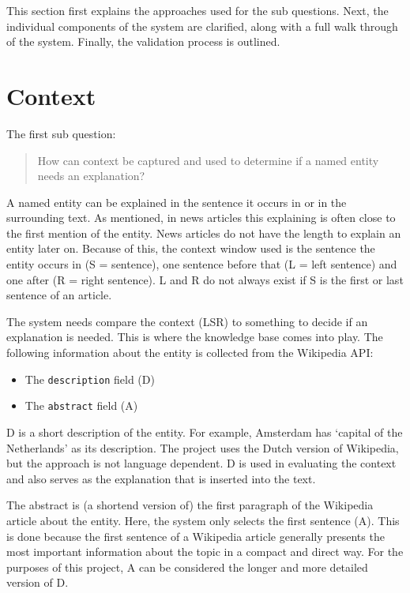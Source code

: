 \documentclass[
10pt, %
a4paper, %
oneside, %
headinclude,footinclude, %
] {book}%
\begin{document}
This section first explains the approaches used for the sub questions.
Next, the individual components of the system are clarified, along with a full walk through of the system.
Finally, the validation process is outlined.

\section{Context}
The first sub question:
\begin{quote}
  How can context be captured and used to determine if a named entity needs an explanation?
\end{quote}

A named entity can be explained in the sentence it occurs in or in the surrounding text.
As mentioned, in news articles this explaining is often close to the first mention of the entity.
News articles do not have the length to explain an entity later on.
Because of this, the context window used is the sentence the entity occurs in (S = sentence), one sentence before that (L = left sentence) and one after (R = right sentence).
L and R do not always exist if S is the first or last sentence of an article.

The system needs compare the context (LSR) to something to decide if an explanation is needed.
This is where the knowledge base comes into play.
The following information about the entity is collected from the Wikipedia API:
\begin{multicols}{2}
  \begin{itemize}
    \item The \verb+description+ field (D)
    \item The \verb+abstract+ field (A)
  \end{itemize}
\end{multicols}

D is a short description of the entity.
For example, Amsterdam has `capital of the Netherlands' as its description.
The project uses the Dutch version of Wikipedia, but the approach is not language dependent.
D is used in evaluating the context and also serves as the explanation that is inserted into the text.

The abstract is (a shortend version of) the first paragraph of the Wikipedia article about the entity.
Here, the system only selects the first sentence (A).
This is done because the first sentence of a Wikipedia article generally presents the most important information about the topic in a compact and direct way.
For the purposes of this project, A can be considered the longer and more detailed version of D.
\end{document}
